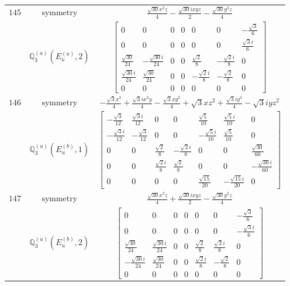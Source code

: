 \documentclass[fleqn,8pt,landscape]{jsarticle}
\begin{document}
\begin{longtable}{ccc}
$ 145 $ & $ \text{symmetry} $ & $ \frac{\sqrt{30} x^{2} z}{4} - \frac{\sqrt{30} i x y z}{2} - \frac{\sqrt{30} y^{2} z}{4} $ \\
$  $ & $ \mathbb{Q}_{3}^{(a)}(E_{u}^{(a)},2) $ & $ \begin{bmatrix} 0 & 0 & 0 & 0 & 0 & 0 & - \frac{\sqrt{3}}{6} \\ 0 & 0 & 0 & 0 & 0 & 0 & \frac{\sqrt{3} i}{6} \\ \frac{\sqrt{30}}{24} & - \frac{\sqrt{30} i}{24} & 0 & 0 & \frac{\sqrt{2}}{8} & - \frac{\sqrt{2} i}{8} & 0 \\ \frac{\sqrt{30} i}{24} & \frac{\sqrt{30}}{24} & 0 & 0 & - \frac{\sqrt{2} i}{8} & - \frac{\sqrt{2}}{8} & 0 \\ 0 & 0 & 0 & 0 & 0 & 0 & 0 \end{bmatrix} $ \\ \hline
$ 146 $ & $ \text{symmetry} $ & $ - \frac{\sqrt{3} x^{3}}{4} + \frac{\sqrt{3} i x^{2} y}{4} - \frac{\sqrt{3} x y^{2}}{4} + \sqrt{3} x z^{2} + \frac{\sqrt{3} i y^{3}}{4} - \sqrt{3} i y z^{2} $ \\
$  $ & $ \mathbb{Q}_{3}^{(a)}(E_{u}^{(b)},1) $ & $ \begin{bmatrix} - \frac{\sqrt{3}}{12} & \frac{\sqrt{3} i}{12} & 0 & 0 & \frac{\sqrt{5}}{10} & \frac{\sqrt{5} i}{10} & 0 \\ - \frac{\sqrt{3} i}{12} & - \frac{\sqrt{3}}{12} & 0 & 0 & - \frac{\sqrt{5} i}{10} & \frac{\sqrt{5}}{10} & 0 \\ 0 & 0 & \frac{\sqrt{2}}{8} & - \frac{\sqrt{2} i}{8} & 0 & 0 & \frac{\sqrt{30}}{60} \\ 0 & 0 & \frac{\sqrt{2} i}{8} & \frac{\sqrt{2}}{8} & 0 & 0 & - \frac{\sqrt{30} i}{60} \\ 0 & 0 & 0 & 0 & \frac{\sqrt{15}}{20} & - \frac{\sqrt{15} i}{20} & 0 \end{bmatrix} $ \\ \hline
$ 147 $ & $ \text{symmetry} $ & $ \frac{\sqrt{30} x^{2} z}{4} + \frac{\sqrt{30} i x y z}{2} - \frac{\sqrt{30} y^{2} z}{4} $ \\
$  $ & $ \mathbb{Q}_{3}^{(a)}(E_{u}^{(b)},2) $ & $ \begin{bmatrix} 0 & 0 & 0 & 0 & 0 & 0 & - \frac{\sqrt{3}}{6} \\ 0 & 0 & 0 & 0 & 0 & 0 & - \frac{\sqrt{3} i}{6} \\ \frac{\sqrt{30}}{24} & \frac{\sqrt{30} i}{24} & 0 & 0 & \frac{\sqrt{2}}{8} & \frac{\sqrt{2} i}{8} & 0 \\ - \frac{\sqrt{30} i}{24} & \frac{\sqrt{30}}{24} & 0 & 0 & \frac{\sqrt{2} i}{8} & - \frac{\sqrt{2}}{8} & 0 \\ 0 & 0 & 0 & 0 & 0 & 0 & 0 \end{bmatrix} $ \\ \hline

\end{longtable}
\end{document}
